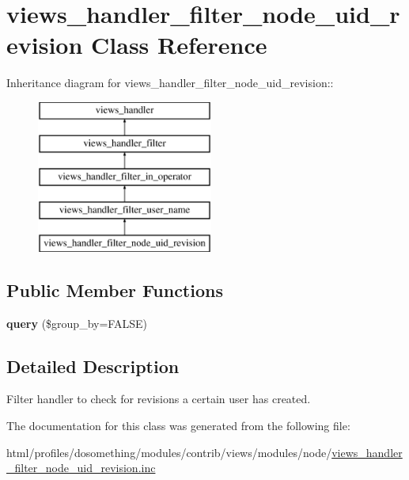 \hypertarget{classviews__handler__filter__node__uid__revision}{
\section{views\_\-handler\_\-filter\_\-node\_\-uid\_\-revision Class Reference}
\label{classviews__handler__filter__node__uid__revision}
}
Inheritance diagram for views\_\-handler\_\-filter\_\-node\_\-uid\_\-revision::\begin{figure}[H]
\begin{center}
\leavevmode
\includegraphics[height=5cm]{classviews__handler__filter__node__uid__revision}
\end{center}
\end{figure}
\subsection*{Public Member Functions}
\begin{DoxyCompactItemize}
\item 
\hypertarget{classviews__handler__filter__node__uid__revision_aacc7409ac45621ee71778f3a31f27256}{
{\bfseries query} (\$group\_\-by=FALSE)}
\label{classviews__handler__filter__node__uid__revision_aacc7409ac45621ee71778f3a31f27256}

\end{DoxyCompactItemize}


\subsection{Detailed Description}
Filter handler to check for revisions a certain user has created. 

The documentation for this class was generated from the following file:\begin{DoxyCompactItemize}
\item 
html/profiles/dosomething/modules/contrib/views/modules/node/\hyperlink{views__handler__filter__node__uid__revision_8inc}{views\_\-handler\_\-filter\_\-node\_\-uid\_\-revision.inc}\end{DoxyCompactItemize}

